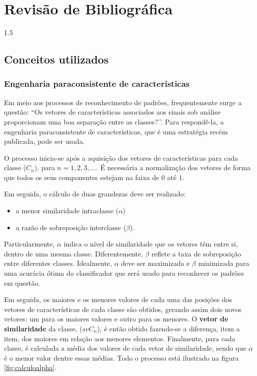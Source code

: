 \documentclass[a4paper,12pt,openright,oneside]{book}
\newenvironment{myenv}[1]
{\begin{spacing}{#1}}
	{\end{spacing}}
\begin{document}
\chapter{Revisão de Bibliográfica}
\begin{myenv}{1.5}
\section{Conceitos utilizados}
\subsection{Engenharia paraconsistente de características}
\par Em meio aos processos de reconhecimento de padrões, frequentemente surge a questão: ``Os vetores de características associados aos sinais sob análise proporcionam uma boa separação entre as classes?’’. Para respondê-la, a engenharia paraconsistente de características, que é uma estratégia recém publicada, pode ser usada. 
\\
\par O processo inicia-se após a aquisição dos vetores de características para cada classe ($C_n$), para $n=1, 2, 3, ...$. É necessária a normalização dos vetores de forma que todos os seus componentes estejam na faixa de $0$ até $1$.
\\
\par Em seguida, o cálculo de duas grandezas deve ser realizado:
\begin{itemize}
\item a menor similaridade intraclasse ($\alpha$)
\item a razão de sobreposição interclasse ($\beta$). 
\end{itemize}
\par Particularmente, $\alpha$ indica o nível de similaridade que os vetores têm entre si, dentro de uma mesma classe. Diferentemente, $\beta$ reflete a taxa de sobreposição entre diferentes classes. Idealmente, $\alpha$ deve ser maximizada e $\beta$ minimizada para uma acurácia ótima do classificador que será usado para reconhecer os padrões em questão.
\\
\par Em seguida, os maiores e os menores valores de cada uma das posições dos vetores de características de cada classe são obtidos, gerando assim dois novos vetores: um para os maiores valores e outro para os menores. O \textbf{vetor de similaridade} da classe, ($svC_n$), é então obtido fazendo-se a diferença, item a item, dos maiores em relação aos menores elementos. Finalmente, para cada classe, é calculada a média dos valores de cada vetor de similaridade, sendo que $\alpha$ é o menor valor dentre essas médias. Todo o processo está ilustrado na figura \ref{fig:calculoalpha}.

\end{myenv}
\end{document}
